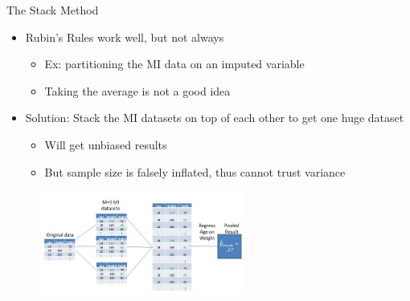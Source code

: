 \begin{frame}{The Stack Method}
 \begin{itemize}
  \item Rubin's Rules work well, but not always
  \begin{itemize}
   \item Ex: partitioning the MI data on an imputed variable
   \item Taking the average is not a good idea
  \end{itemize}
    \item Solution: Stack the MI datasets on top of each other to get one huge dataset
    \begin{itemize}
     \item Will get unbiased results
     \item But sample size is falsely inflated, thus cannot trust variance
    \end{itemize}
 \end{itemize}
 \begin{figure}[h!]
  \centering
    \includegraphics[width=0.6\textwidth]{stacked}
\label{fig:stacked}
\end{figure}
\end{frame}
